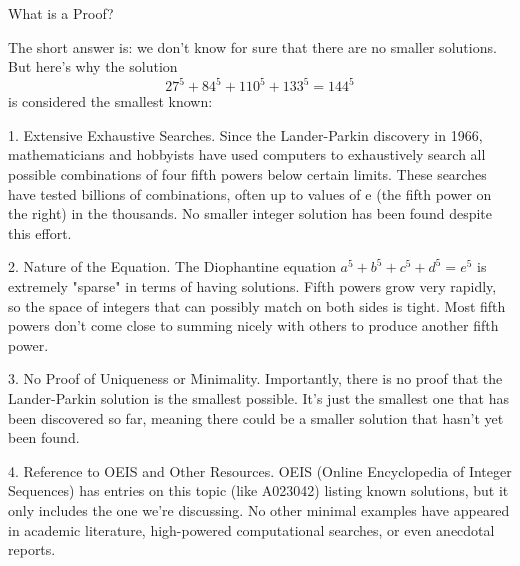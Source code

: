 \documentclass[aspectratio=169,compress,10pt]{beamer}
\begin{document}
\begin{frame}[fragile]{What is a Proof?}
{The short answer is: we don't know for sure that there are no smaller solutions. But here's why the
    solution \[
        27^5 +84^5 +110^5 +133^5 = 144^5
    \]
is considered the smallest known:

1. Extensive Exhaustive Searches. Since the Lander-Parkin discovery in 1966, mathematicians and hobbyists have used computers to exhaustively search all possible combinations of four fifth powers below certain limits.
These searches have tested billions of combinations, often up to values of e (the fifth power on the right) in the thousands.
No smaller integer solution has been found despite this effort.

2. Nature of the Equation. The Diophantine equation $a^5 + b^5 + c^5 + d^5 = e^5$ is extremely "sparse" in terms of having solutions.
Fifth powers grow very rapidly, so the space of integers that can possibly match on both sides is tight.
Most fifth powers don't come close to summing nicely with others to produce another fifth power.

3. No Proof of Uniqueness or Minimality. Importantly, there is no proof that the Lander-Parkin solution is the smallest possible.
It's just the smallest one that has been discovered so far, meaning there could be a smaller solution that hasn't yet been found.

4. Reference to OEIS and Other Resources. OEIS (Online Encyclopedia of Integer Sequences) has entries on this topic (like A023042) listing known solutions, but it only includes the one we're discussing. No other minimal examples have appeared in academic literature, high-powered computational searches, or even anecdotal reports.

}
\end{frame}
\end{document}
